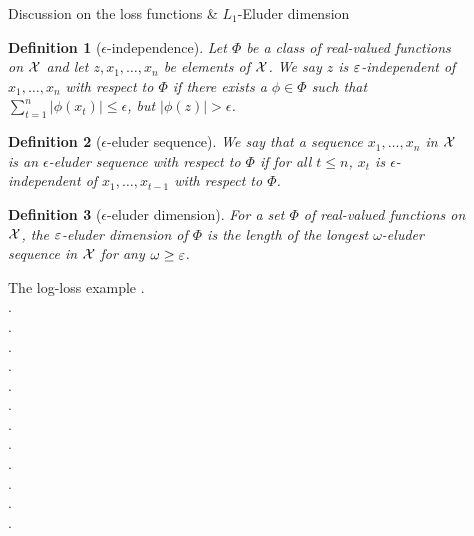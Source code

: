 \documentclass[final,notheorems,noamsthm,20pt]{beamer}
\newtheorem{definition}{Definition}
\newlength{\sepwidth}
\newlength{\colwidth}
\newcommand{\separatorcolumn}{\begin{column}{\sepwidth}\end{column}}
\begin{document}
\begin{frame}[t]
\begin{columns}[t]
\begin{column}{\colwidth}
\begin{block}{Discussion on the loss functions \& $L_1$-Eluder dimension}
    \begin{definition}[$\epsilon$-independence]
        Let $\Phi$ be a class of real-valued functions on $\mathcal{X}$ and let $z, x_1, \dotsc, x_n$ be elements of $\mathcal{X}$. We say $z$ is $\varepsilon$-independent of $x_1, \dotsc, x_n$ with respect to $\Phi$ if there exists a $\phi \in \Phi$ such that $\sum_{t=1}^n |\phi(x_t)| \leq \epsilon$, but $|\phi(z)| > \epsilon$.
    \end{definition}
    \begin{definition}[$\epsilon$-eluder sequence]
        We say that a sequence $x_1, \dotsc, x_n$ in $\mathcal{X}$ is an $\epsilon$-eluder sequence with respect to $\Phi$ if for all $t \leq n$, $x_t$ is $\epsilon$-independent of $x_1, \dotsc, x_{t-1}$ with respect to $\Phi$.
    \end{definition}
    \begin{definition}[$\epsilon$-eluder dimension]\label{def:eluder-dim}
        For a set $\Phi$ of real-valued functions on $\mathcal{X}$, the $\varepsilon$-eluder dimension of $\Phi$ is the length of the longest $\omega$-eluder sequence in $\mathcal{X}$ for any $\omega \geq \varepsilon$.
    \end{definition}

    \end{block}
    \begin{exampleblock}{The log-loss example}
    .\\
    .\\
    .\\
    .\\
    .\\
    .\\
    .\\
    .\\
    .\\
    .\\
    .\\
    .\\
    .\\
    \end{exampleblock}

\end{column}

\separatorcolumn

\begin{column}{\colwidth}


\end{column}
\end{columns}
\end{frame}
\end{document}
